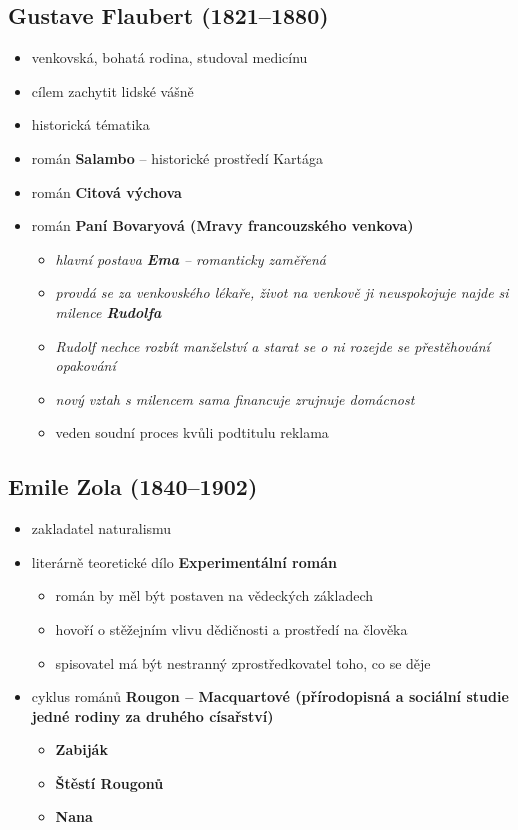 \subsection{Gustave Flaubert (1821--1880)}
\begin{itemize}
\item venkovská, bohatá rodina, studoval medicínu
\item cílem zachytit lidské vášně 
\item historická tématika
\item román \textbf{Salambo} -- historické prostředí Kartága
\item román \textbf{Citová výchova}
\item román \textbf{Paní Bovaryová (Mravy francouzského venkova)}
	\begin{itemize}
	\item \textit{hlavní postava \textbf{Ema} -- romanticky zaměřená}
	\item \textit{provdá se za venkovského lékaře, život na venkově ji neuspokojuje \ra najde si milence \textbf{Rudolfa}}
	\item \textit{Rudolf nechce rozbít manželství a starat se o ni \ra rozejde se \ra přestěhování \ra opakování}
	\item \textit{nový vztah s milencem sama financuje \ra zrujnuje domácnost}
	\item veden soudní proces kvůli podtitulu \ra reklama 
	\end{itemize}
\end{itemize}

\subsection{Emile Zola (1840--1902)}
\begin{itemize}
\item zakladatel naturalismu
\item literárně teoretické dílo \textbf{Experimentální román}
	\begin{itemize}
	\item román by měl být postaven na vědeckých základech
	\item hovoří o stěžejním vlivu dědičnosti a prostředí na člověka
	\item spisovatel má být nestranný zprostředkovatel toho, co se děje
	\end{itemize}
\item cyklus románů \textbf{Rougon -- Macquartové (přírodopisná a sociální studie jedné rodiny za druhého císařství)}
	\begin{itemize}
	\item \textbf{Zabiják}
	\item \textbf{Štěstí Rougonů}
	\item \textbf{Nana}
	\end{itemize}
\end{itemize}



